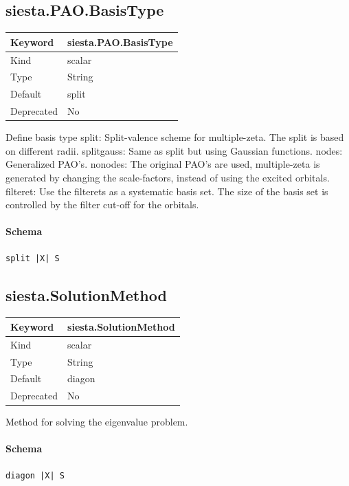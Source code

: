 \documentclass[11pt]{article}
\begin{document}
{{{{{\subsection{siesta.PAO.BasisType}
\label{kw:siesta-PAO-BasisType}
\begin{longtable}{|p{1.5in}|p{4.5in}|}
\hline
Keyword & siesta.PAO.BasisType \\
\hline
Kind & scalar \\
\hline
Type & String \\
\hline
Default & split \\
\hline
Deprecated & No \\
\hline
\end{longtable}
 Define basis type
 split: Split-valence scheme for multiple-zeta. The split is based on different radii.
 splitgauss: Same as split but using Gaussian functions.
 nodes: Generalized PAO’s.
 nonodes: The original PAO’s are used, multiple-zeta is generated by changing the
 scale-factors, instead of using the excited orbitals.
 filteret: Use the filterets as a systematic basis set. The size of the basis set is
 controlled by the filter cut-off for the orbitals.

\paragraph{Schema}
\begin{Verbatim}
split |X| S
\end{Verbatim}

\subsection{siesta.SolutionMethod}
\label{kw:siesta-SolutionMethod}
\begin{longtable}{|p{1.5in}|p{4.5in}|}
\hline
Keyword & siesta.SolutionMethod \\
\hline
Kind & scalar \\
\hline
Type & String \\
\hline
Default & diagon \\
\hline
Deprecated & No \\
\hline
\end{longtable}
 Method for solving the eigenvalue problem.

\paragraph{Schema}
\begin{Verbatim}
diagon |X| S
\end{Verbatim}

}}}}}
\end{document}
